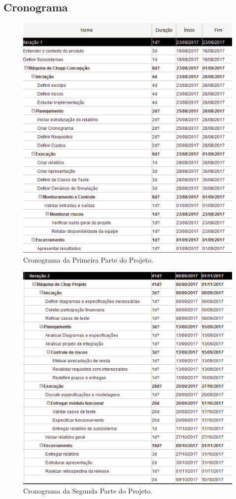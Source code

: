 		\subsection[Cronograma]{Cronograma}
			\begin{figure}[H]
				\centering
				\includegraphics[scale= 0.9]{figuras/cronograma1.png}
				\caption{Cronograma da Primeira Parte do Projeto.}
				\label{cronograma1}
			\end{figure}

			\begin{figure}[H]
				\centering
				\includegraphics[scale= 0.7]{figuras/cronograma2.png}
				\caption{Cronograma da Segunda Parte do Projeto.}
				\label{cronograma2}
			\end{figure}

